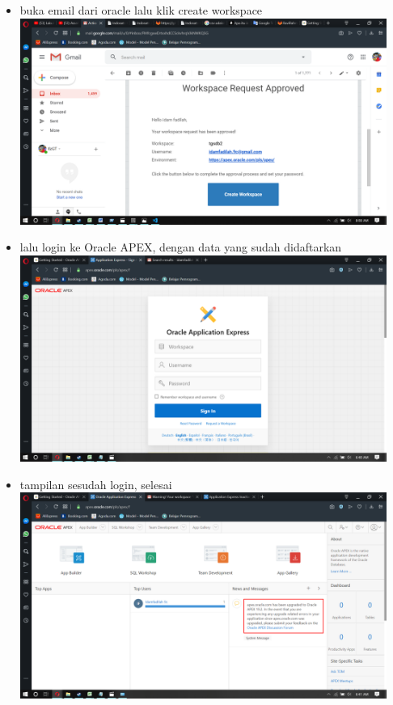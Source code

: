 \documentclass[a4paper,12pt]{report}
\begin{document}
\begin{itemize}
	\item buka email dari oracle lalu klik create workspace\\ \includegraphics[width=12cm]{gambar/Screenshot (119).png} 
	\item lalu login ke Oracle APEX, dengan data yang sudah didaftarkan\\
\includegraphics[width=12cm]{gambar/Screenshot (114).png} 
	\item tampilan sesudah login, selesai\\
\includegraphics[width=12cm]{gambar/Screenshot (115).png} 
\end{itemize}
\end{document}
